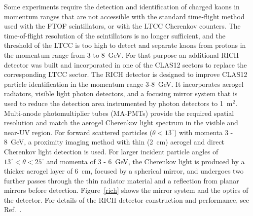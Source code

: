 \documentclass[final,3p,twocolumn]{elsarticle}
\begin{document}
Some experiments require the detection and identification of charged kaons in momentum ranges that are not 
accessible with the standard time-flight method used with the FTOF scintillators, or with the LTCC Cherenkov
counters. The time-of-flight resolution of the scintillators is no longer sufficient, and the threshold of the LTCC
is too high to detect and separate kaons from protons in the momentum range from 3 to 8~GeV. For that purpose
an additional RICH detector was built and incorporated in one of the CLAS12 sectors to replace the corresponding
LTCC sector. The RICH detector is designed to improve CLAS12 particle identification in the momentum range
3-8~GeV. It incorporates aerogel radiators, visible light photon detectors, and a focusing mirror system that is
used to reduce the detection area instrumented by photon detectors to 1~m$^2$.  Multi-anode photomultiplier
tubes (MA-PMTs) provide the required spatial resolution and match the aerogel Cherenkov light spectrum in the
visible and near-UV region. For forward scattered particles ($\theta < 13^\circ$) with momenta 3 - 8~GeV, a
proximity imaging method with thin (2~cm) aerogel and direct Cherenkov light detection is used. For larger incident
particle angles of $13^\circ < \theta < 25^\circ$ and momenta of 3 - 6~GeV, the Cherenkov light is produced by a
thicker aerogel layer of 6~cm, focused by a spherical mirror, and undergoes two further passes through the
thin radiator material and a reflection from planar mirrors before detection. Figure~\ref{rich} shows the mirror
system and the optics of the detector. For details of the RICH detector construction and performance, see
Ref.~\cite{RICH}.
\end{document}
